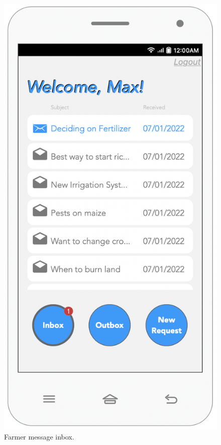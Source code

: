 \begin{multicols}{2}
\begin{figure}[H]
\includegraphics[scale=0.5]{../images_diagrams/mock_ups/dd/Req01_Inbox.png}
\caption{\label{fig:mock_inbox}Farmer message inbox.}
\end{figure}


\end{multicols}
